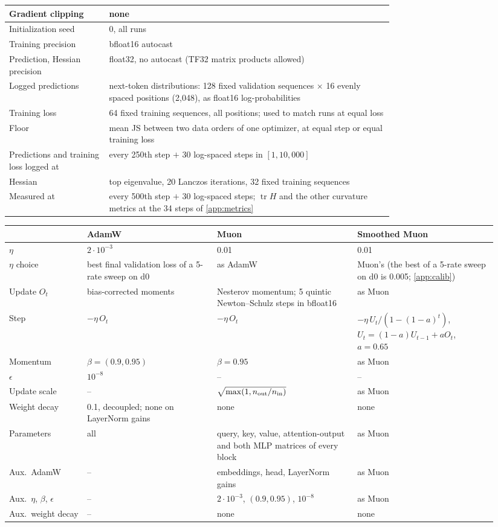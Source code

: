 \begin{center}
\begin{tabular}{@{}lp{0.74\linewidth}@{}}
Gradient clipping & none \\
\hline
Initialization seed & 0, all runs \\
Training precision & bfloat16 autocast \\
Prediction, Hessian precision & float32, no autocast (TF32 matrix products allowed) \\
\hline
Logged predictions & next-token distributions: 128 fixed validation sequences $\times$ 16 evenly spaced positions
  (2{,}048), as float16 log-probabilities \\
Training loss & 64 fixed training sequences, all positions; used to match runs at equal loss \\
Floor & mean JS between two data orders of one optimizer, at equal step or equal training loss \\
Predictions and training loss logged at & every 250th step $+$ 30 log-spaced steps in $[1, 10{,}000]$ \\
\hline
Hessian & top eigenvalue, 20 Lanczos iterations, 32 fixed training sequences \\
Measured at & every 500th step $+$ 30 log-spaced steps; $\operatorname{tr}H$ and the other curvature metrics at the 34
  steps of \cref{app:metrics} \\
\hline
\end{tabular}
\end{center}

\begin{center}\small
\captionsetup{type=table}
\caption{Optimizer-specific hyperparameters. $n_{\rm out}$, $n_{\rm in}$: output and input size of the matrix.
Smoothed Muon differs from Muon in the rows ``Step'' and ``$\eta$ choice'' only.}
\label{tab:app-optim}
\setlength{\tabcolsep}{4pt}
\begin{tabular}{@{}p{0.15\linewidth}p{0.25\linewidth}p{0.27\linewidth}p{0.27\linewidth}@{}}
\hline
 & AdamW & Muon & Smoothed Muon \tabularnewline
\hline
$\eta$ & $2\cdot10^{-3}$ & 0.01 & 0.01 \tabularnewline
$\eta$ choice & \raggedright best final validation loss of a 5-rate sweep on d0 & as AdamW &
  \raggedright Muon's (the best of a 5-rate sweep on d0 is 0.005; \cref{app:calib}) \tabularnewline
Update $O_t$ & bias-corrected moments & \raggedright Nesterov momentum; 5 quintic Newton--Schulz steps in bfloat16 &
  as Muon \tabularnewline
Step & $-\eta\,O_t$ & $-\eta\,O_t$ & \raggedright $-\eta\,U_t/(1-(1-a)^t)$, $U_t=(1-a)U_{t-1}+aO_t$, $a=0.65$
  \tabularnewline
Momentum & $\beta=(0.9,0.95)$ & $\beta=0.95$ & as Muon \tabularnewline
$\epsilon$ & $10^{-8}$ & -- & -- \tabularnewline
Update scale & -- & $\sqrt{\max(1,n_{\rm out}/n_{\rm in})}$ & as Muon \tabularnewline
Weight decay & \raggedright 0.1, decoupled; none on LayerNorm gains & none & none \tabularnewline
Parameters & all & \raggedright query, key, value, attention-output and both MLP matrices of every block & as Muon
  \tabularnewline
\hline
Aux.\ AdamW & -- & embeddings, head, LayerNorm gains & as Muon \tabularnewline
Aux.\ $\eta$, $\beta$, $\epsilon$ & -- & $2\cdot10^{-3}$, $(0.9,0.95)$, $10^{-8}$ & as Muon \tabularnewline
Aux.\ weight decay & -- & none & none \tabularnewline
\hline
\end{tabular}
\end{center}

